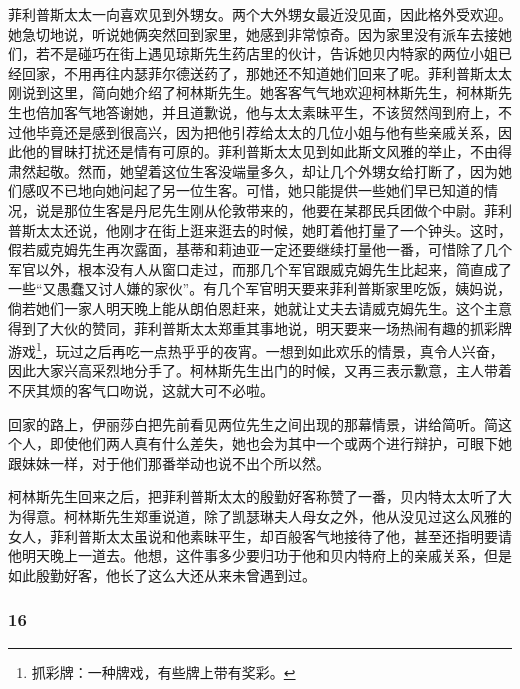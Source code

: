 \par 菲利普斯太太一向喜欢见到外甥女。两个大外甥女最近没见面，因此格外受欢迎。她急切地说，听说她俩突然回到家里，她感到非常惊奇。因为家里没有派车去接她们，若不是碰巧在街上遇见琼斯先生药店里的伙计，告诉她贝内特家的两位小姐已经回家，不用再往内瑟菲尔德送药了，那她还不知道她们回来了呢。菲利普斯太太刚说到这里，简向她介绍了柯林斯先生。她客客气气地欢迎柯林斯先生，柯林斯先生也倍加客气地答谢她，并且道歉说，他与太太素昧平生，不该贸然闯到府上，不过他毕竟还是感到很高兴，因为把他引荐给太太的几位小姐与他有些亲戚关系，因此他的冒昧打扰还是情有可原的。菲利普斯太太见到如此斯文风雅的举止，不由得肃然起敬。然而，她望着这位生客没端量多久，却让几个外甥女给打断了，因为她们感叹不已地向她问起了另一位生客。可惜，她只能提供一些她们早已知道的情况，说是那位生客是丹尼先生刚从伦敦带来的，他要在某郡民兵团做个中尉。菲利普斯太太还说，他刚才在街上逛来逛去的时候，她盯着他打量了一个钟头。这时，假若威克姆先生再次露面，基蒂和莉迪亚一定还要继续打量他一番，可惜除了几个军官以外，根本没有人从窗口走过，而那几个军官跟威克姆先生比起来，简直成了一些“又愚蠢又讨人嫌的家伙”。有几个军官明天要来菲利普斯家里吃饭，姨妈说，倘若她们一家人明天晚上能从朗伯恩赶来，她就让丈夫去请威克姆先生。这个主意得到了大伙的赞同，菲利普斯太太郑重其事地说，明天要来一场热闹有趣的抓彩牌游戏\footnote{抓彩牌：一种牌戏，有些牌上带有奖彩。}，玩过之后再吃一点热乎乎的夜宵。一想到如此欢乐的情景，真令人兴奋，因此大家兴高采烈地分手了。柯林斯先生出门的时候，又再三表示歉意，主人带着不厌其烦的客气口吻说，这就大可不必啦。
\par 回家的路上，伊丽莎白把先前看见两位先生之间出现的那幕情景，讲给简听。简这个人，即使他们两人真有什么差失，她也会为其中一个或两个进行辩护，可眼下她跟妹妹一样，对于他们那番举动也说不出个所以然。
\par 柯林斯先生回来之后，把菲利普斯太太的殷勤好客称赞了一番，贝内特太太听了大为得意。柯林斯先生郑重说道，除了凯瑟琳夫人母女之外，他从没见过这么风雅的女人，菲利普斯太太虽说和他素昧平生，却百般客气地接待了他，甚至还指明要请他明天晚上一道去。他想，这件事多少要归功于他和贝内特府上的亲戚关系，但是如此殷勤好客，他长了这么大还从来未曾遇到过。



\subsubsection*{16}


